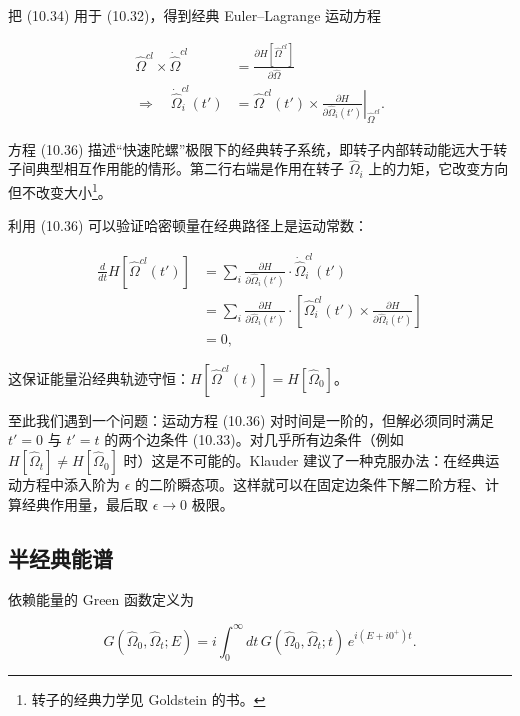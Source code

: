 把 (10.34) 用于 (10.32)，得到经典 Euler--Lagrange 运动方程

\begin{align*}
\hat {\Omega} ^ {cl} \times \dot {\hat {\Omega}} ^ {cl} & = \frac {\partial H [ \hat {\Omega} ^ {cl} ]}{\partial \hat {\Omega}}\\
\Rightarrow \quad \dot {\hat {\Omega}} _ {i} ^ {cl} ( t ' ) & = \left. \hat {\Omega} ^ {cl} ( t ' ) \times \frac {\partial H}{\partial \hat {\Omega} _ {i} ( t ' )} \right| _ {\hat {\Omega} ^ {cl}} .
\tag{10.36}
\end{align*}

方程 (10.36) 描述“快速陀螺”极限下的经典转子系统，即转子内部转动能远大于转子间典型相互作用能的情形。第二行右端是作用在转子 $\hat{\Omega}_{i}$ 上的力矩，它改变方向但不改变大小\footnote{转子的经典力学见 Goldstein 的书。}。

利用 (10.36) 可以验证哈密顿量在经典路径上是运动常数：

\begin{align*}
\frac {d}{d t} H [ \hat {\Omega} ^ {cl} ( t ' ) ] & = \sum_ {i} \frac {\partial H}{\partial \hat {\Omega} _ {i} ( t ' )} \cdot \dot {\hat {\Omega}} _ {i} ^ {cl} ( t ' )\\
& = \sum_ {i} \frac {\partial H}{\partial \hat {\Omega} _ {i} ( t ' )} \cdot \left[ \hat {\Omega} _ {i} ^ {cl} ( t ' ) \times \frac {\partial H}{\partial \hat {\Omega} _ {i} ( t ' )} \right]\\
& = 0 ,
\tag{10.37}
\end{align*}

这保证能量沿经典轨迹守恒：$H[\hat{\Omega}^{cl}(t)] = H[\hat{\Omega}_{0}]$。

至此我们遇到一个问题：运动方程 (10.36) 对时间是一阶的，但解必须同时满足 $t' = 0$ 与 $t' = t$ 的两个边条件 (10.33)。对几乎所有边条件（例如 $H[\hat{\Omega}_{t}] \neq H[\hat{\Omega}_{0}]$ 时）这是不可能的。Klauder 建议了一种克服办法：在经典运动方程中添入阶为 $\epsilon$ 的二阶瞬态项。这样就可以在固定边条件下解二阶方程、计算经典作用量，最后取 $\epsilon \to 0$ 极限。

\subsection{半经典能谱}

依赖能量的 Green 函数定义为

\begin{equation*}
G ( \hat {\Omega} _ {0}, \hat {\Omega} _ {t}; E ) = i \int_ {0} ^ {\infty} d t \, G ( \hat {\Omega} _ {0}, \hat {\Omega} _ {t}; t ) \, e ^ {i ( E + i 0 ^ {+} ) t}.
\tag{10.38}
\end{equation*}

